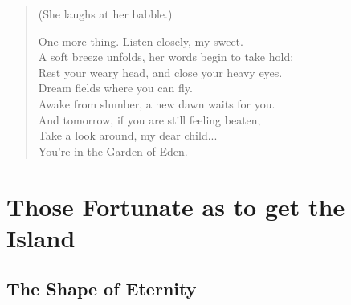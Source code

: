 \documentclass[11pt, letterpaper]{article}
\begin{document}
\begin{verse}
(She laughs at her babble.)

One more thing. Listen closely, my sweet.\\
A soft breeze unfolds, her words begin to take hold:\\
Rest your weary head, and close your heavy eyes.\\
Dream fields where you can fly.\\
Awake from slumber, a new dawn waits for you.\\
And tomorrow, if you are still feeling beaten,\\
Take a look around, my dear child...\\
You’re in the Garden of Eden.
\end{verse}

\newpage

\section*{Those Fortunate as to get the Island}
\subsection*{The Shape of Eternity}
\end{document}
